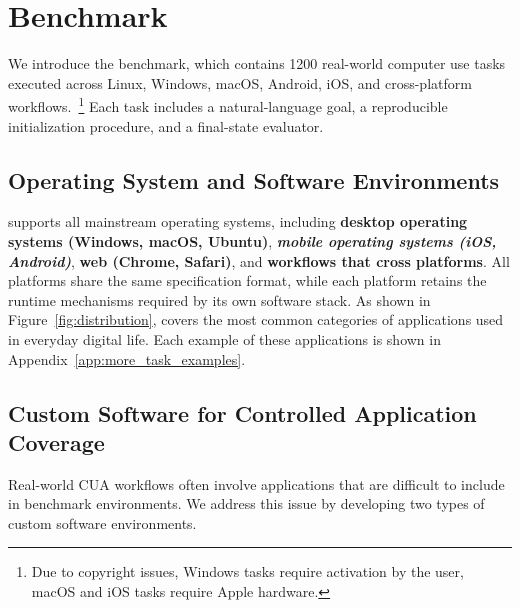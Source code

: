 \section{\dataset Benchmark}
We introduce the \dataset benchmark, which contains 1200 real-world computer use tasks executed across Linux, Windows, macOS, Android, iOS, and cross-platform workflows.~\footnote{Due to copyright issues, Windows tasks require activation by the user, macOS and iOS tasks require Apple hardware.} Each task includes a natural-language goal, a reproducible initialization procedure, and a final-state evaluator.

\subsection{Operating System and Software Environments}

\dataset supports all mainstream operating systems, including \textbf{{desktop operating systems (Windows\windowsicon, macOS\macicon, Ubuntu\linuxicon)}}, \textbf{\textit{mobile operating systems (iOS\iosicon, Android\androidicon)}}, \textbf{{web (Chrome\chromeicon, Safari\safariicon)}}, and \textbf{{workflows that cross platforms}}. All platforms share the same specification format, while each platform retains the runtime mechanisms required by its own software stack. As shown in Figure~\ref{fig:distribution}, \dataset covers the most common categories of applications used in everyday digital life. Each example of these applications is shown in Appendix~\ref{app:more_task_examples}. 


% 



\subsection{Custom Software for Controlled Application Coverage}
Real-world CUA workflows often involve applications that are difficult to include in benchmark environments. We address this issue by developing two types of custom software environments.

